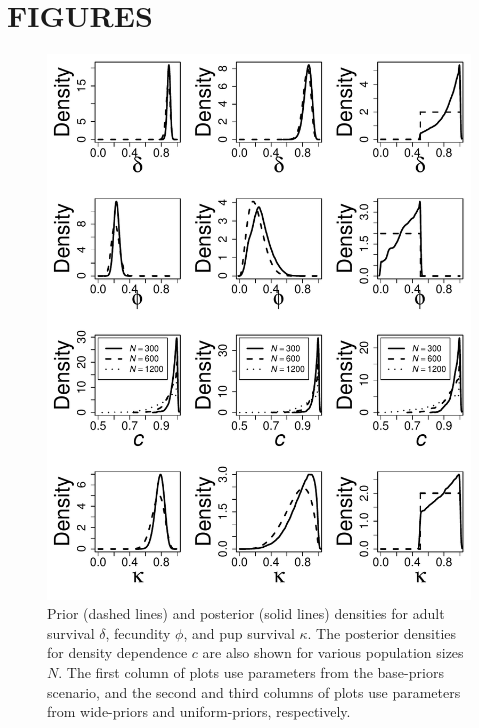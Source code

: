 \documentclass[12pt, titlepage]{article}\usepackage[]{graphicx}\usepackage[]{color}
\begin{document}
\clearpage

\section*{FIGURES}




\begin{figure}[H]
  \begin{center}
  \includegraphics[width=0.85\linewidth]{figure/plot-demparms-1.pdf}
  \end{center}
  \caption{Prior (dashed lines) and posterior (solid lines) densities for adult survival $\delta$, fecundity $\phi$, and pup survival $\kappa$. The posterior densities for density dependence $c$ are also shown for various population sizes $N$. The first column of plots use parameters from the base-priors scenario, and the second and third columns of plots use parameters from wide-priors and uniform-priors, respectively. \label{plot-demparms}}         
\end{figure}
\end{document}
